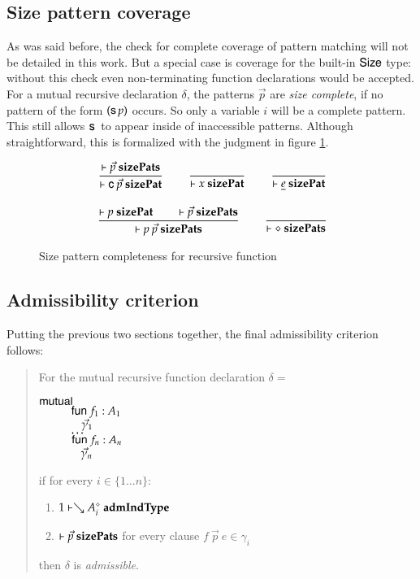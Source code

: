 \subsection{Size pattern coverage}

As was said before, the check for complete coverage of pattern matching will not be detailed in this work. 
But a special case is coverage for the built-in $\mathsf{Size}$ type: without this check even non-terminating function declarations would be accepted. 
For a mutual recursive declaration $\delta$, the patterns $\vec{p}$ are \emph{size complete}, if no pattern of the form $(\mathsf{s}\, p)$ occurs. So only a variable $i$ will be a complete pattern. This still allows $\mathsf{s}\,$ to appear inside of inaccessible patterns.
Although straightforward, this is formalized with the judgment in figure \ref{spj}.

\begin{figure}[htp]
\begin{gather*}
\ \dfrac{\vdash\vec{p}\mbox{ \textbf{sizePats}}}{\vdash\mathsf{c} \: \vec{p}\mbox{ \textbf{sizePat}}}
\qquad
\ \dfrac{}{\vdash x\mbox{ \textbf{sizePat}}}
\qquad
\ \dfrac{}{\vdash\underline{e}\mbox{ \textbf{sizePat}}}
\\[2ex]
\ \dfrac{\vdash p\mbox{ \textbf{sizePat}} \qquad \vdash\vec{p}\mbox{ \textbf{sizePats}}}{\vdash p \: \vec{p}\mbox{ \textbf{sizePats}}}
\qquad
\ \dfrac{}{\vdash\diamond\mbox{ \textbf{sizePats}}}
\end{gather*}
\caption{Size pattern completeness for recursive function}
\label{spj}
\end{figure}


\subsection{Admissibility criterion}
Putting the previous two sections together,
the final admissibility criterion follows:
\begin{quote}
For the mutual recursive function declaration $\delta =$
\begin{bsp}
$\mathsf{mutual}\:$\\
$\spcx \fun f_1 : A_1 $\\
$\spcx \spc \vec{\gamma}_1$\\
$\spcx \ldots$\\
$\spcx \fun f_n : A_n $\\
$\spcx \spc \vec{\gamma}_n$
\end{bsp}
if  for every $i \in \{1 \ldots n \}$:
\begin{enumerate}
\item
$1\vdash\searrow A_i^{\diamond}\mbox{ \textbf{admIndType}}$
\item
$\vdash\vec{p}\mbox{ \textbf{sizePats}}$ for every clause $f \: \vec{p} \: e \in \gamma_i$
\end{enumerate}
then $\delta$ is \emph{admissible}.
\end{quote}

